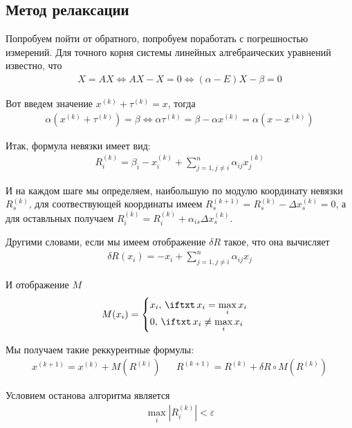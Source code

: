 \subsection{Метод релаксации}

Попробуем пойти от обратного, попробуем поработать с погрешностью измерений. Для точного корня системы линейных алгебраических уравнений известно, что
\begin{align}
  X = AX \Leftrightarrow AX - X = 0 \Leftrightarrow (\alpha - E) X - \beta = 0
\end{align}

Вот введем значение \(x^{(k)} + \tau^{(k)} = x\), тогда
\begin{align}
  \alpha (x^{(k)} + \tau^{(k)}) = \beta \Leftrightarrow \alpha \tau^{(k)} = \beta - \alpha x^{(k)} = \alpha(x - x^{(k)})
\end{align}

Итак, формула невязки имеет вид:
\begin{align}
  R_i^{(k)} = \beta_i  - x_i^{(k)} + \sum_{j=1, j\neq i}^n \alpha_{ij} x_j^{(k)}
\end{align}

И на каждом шаге мы определяем, наибольшую по модулю координату невязки \(R_s^{(k)}\), для соотвествующей координаты имеем \(R_s^{(k + 1)} = R_s^{(k)} - \Delta x_s^{(k)} =  0\), а для оставльных получаем \(R_i^{(k)} = R_i^{(k)} + \alpha_{is} \Delta x_s^{(k)}\).

Другими словами, если мы имеем отображение \(\delta R\) такое, что она вычисляет
\begin{align}
  \delta R(x_i) = -x_i + \sum_{j=1, j\neq i}^n \alpha_{ij} x_j
\end{align}

И отображение \(M\)
\begin{align}
  M(x_i) = \begin{cases}
    x_i,\,\iftxt\, x_i = \max\limits_i x_i\\
    0,\,\iftxt\, x_i \neq \max\limits_i x_i\\
  \end{cases}
\end{align}

Мы получаем такие реккурентные формулы:
\begin{align}\label{eq:relax-iter}
  x^{(k + 1)} = x^{(k)} + M(R^{(k)}) & & R^{(k + 1)} = R^{(k)} + \delta R \circ M (R^{(k)})
\end{align}

Условием останова алгоритма является
\begin{align}\label{eq:relax-cond}
  \max_i |R_i^{(k)}| < \varepsilon
\end{align}

